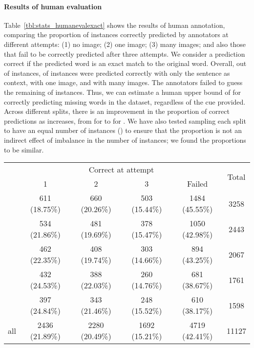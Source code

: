 \documentclass[twocolumn]{svjour3}          \smartqed  \usepackage{graphicx}
\begin{document}
\paragraph{Results of human evaluation}

Table~\ref{tbl:stats_humanevalexact} shows the results of human annotation, comparing the proportion of instances correctly predicted by annotators at different attempts: (1) no image; (2) one image; (3) many images; and also those that fail to be correctly predicted after three attempts. We consider a prediction correct if the predicted word is an exact match to the original word. Overall, out of  instances,  of instances were predicted correctly with only the sentence as context,  with one image, and  with many images. The annotators failed to guess the remaining  of instances. Thus, we can estimate a human upper bound of  for correctly predicting missing words in the dataset, regardless of the cue provided. Across different  splits, there is an improvement in the proportion of correct predictions as  increases, from  for  to  for . We have also tested sampling each split to have an equal number of instances () to ensure that the proportion is not an indirect effect of imbalance in the number of instances; we found the proportions to be similar.

\begin{table*}[t]
    \caption{Distribution across different attempts by humans in the fill-in-the-blank task.}
    \label{tbl:stats_humanevalexact}
    \centering
    \small
    \begin{tabular}{cccccc}
    \toprule
    & \multicolumn{4}{c}{Correct at attempt} &
    \multirow{2}{*}{Total} \\
    \noalign{\smallskip}    
    \cline{2-5}
    \noalign{\smallskip}
    & 1 & 2 & 3 & Failed & \\
    \midrule
     & 611 (18.75\%) & 660 (20.26\%) & 503 (15.44\%) & 1484 (45.55\%) & 3258\\
     & 534 (21.86\%) & 481 (19.69\%) & 378 (15.47\%) & 1050 (42.98\%) & 2443\\
     & 462 (22.35\%) & 408 (19.74\%) & 303 (14.66\%) & 894 (43.25\%) & 2067\\
     & 432 (24.53\%) & 388 (22.03\%) & 260 (14.76\%) & 681 (38.67\%) & 1761\\
     & 397 (24.84\%) & 343 (21.46\%) & 248 (15.52\%) & 610 (38.17\%) & 1598\\
    \midrule
    all & 2436 (21.89\%) & 2280 (20.49\%) & 1692 (15.21\%) & 4719 (42.41\%) & 11127\\
    \bottomrule
    \end{tabular}
\end{table*}
\end{document}
